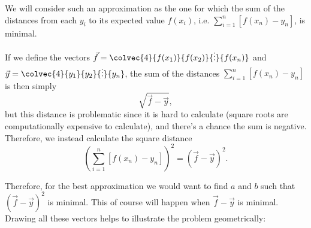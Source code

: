 We will consider such an approximation as the one for which the sum of the distances from each $y_{i}$ to its expected value $f(x_{i})$, i.e. $\sum\limits_{i=1}^{n}\left[f(x_{n})-y_{n}\right]$, is minimal.

\begin{figure}[H]
  \centering
\end{figure}

If we define the vectors $\vec{f}=\colvec{4}{f(x_{1})}{f(x_{2})}{\vdots}{f(x_{n})}$ and $\vec{y}=\colvec{4}{y_{1}}{y_{2}}{\vdots}{y_{n}}$, the sum of the distances $\sum\limits_{i=1}^{n}\left[f(x_{n})-y_{n}\right]$ is then simply
\begin{equation*}
  \sqrt{\vec{f}-\vec{y}},
\end{equation*}
but this distance is problematic since it is hard to calculate (square roots are computationally expensive to calculate), and there's a chance the sum is negative. Therefore, we instead calculate the square distance
\begin{equation*}
  \left( \sum\limits_{i=1}^{n}\left[f(x_{n})-y_{n}\right] \right)^{2} = \left( \vec{f}-\vec{y} \right)^{2}.
\end{equation*}

Therefore, for the best approximation we would want to find $a$ and $b$ such that $\left( \vec{f}-\vec{y} \right)^{2}$ is minimal. This of course will happen when $\vec{f}-\vec{y}$ is minimal. Drawing all these vectors helps to illustrate the problem geometrically:

\begin{figure}[H]
  \centering
\end{figure}

